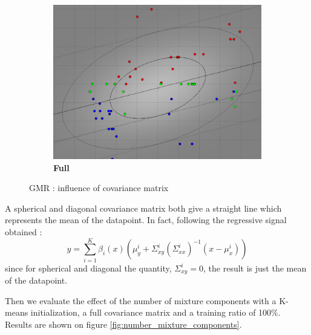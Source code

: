 \begin{figure}[!ht]
\begin{subfigure}[h]{0.3\textwidth}
\includegraphics[height=0.11\textheight]{./regression/full_cov_kmeans_1_mixture_100train.png}
\caption{\bf Full}
\end{subfigure}
\caption{GMR : influence of covariance matrix}
\label{fig:covariance_matrix_gmr}
\end{figure}



A spherical and diagonal covariance matrix both give a straight line which represents the mean of the datapoint. In fact, following the regressive signal obtained :
\begin{equation}
y = \sum_{i=1}^K \beta_i(x)(\mu_y^i + \Sigma_{xy}^i (\Sigma_{xx}^i)^{-1}(x - \mu_x^i))  
\label{GMR_output}
\end{equation}
since for spherical and diagonal the quantity, $\Sigma_{xy}^i = 0$, the result is just the mean of the datapoint. 

Then we evaluate the effect of the number of mixture components with a K-means initialization, a full covariance matrix and a training ratio of 100\%. Results are shown on figure \ref{fig:number_mixture_components}.

